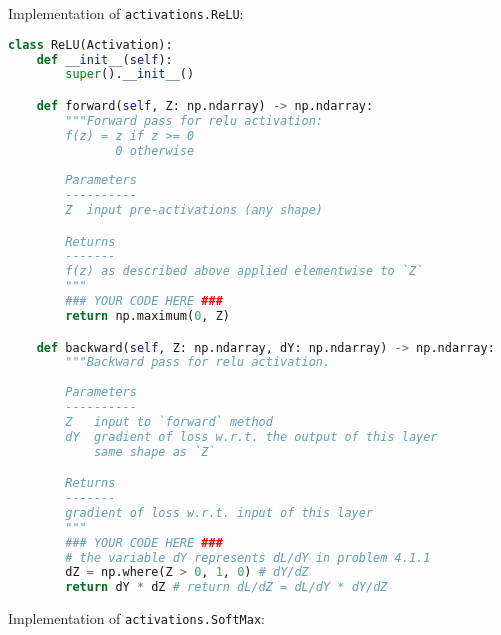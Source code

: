 Implementation of \texttt{activations.ReLU}:

\begin{lstlisting}[language=Python]
class ReLU(Activation):
    def __init__(self):
        super().__init__()

    def forward(self, Z: np.ndarray) -> np.ndarray:
        """Forward pass for relu activation:
        f(z) = z if z >= 0
               0 otherwise
        
        Parameters
        ----------
        Z  input pre-activations (any shape)

        Returns
        -------
        f(z) as described above applied elementwise to `Z`
        """
        ### YOUR CODE HERE ###
        return np.maximum(0, Z)

    def backward(self, Z: np.ndarray, dY: np.ndarray) -> np.ndarray:
        """Backward pass for relu activation.
        
        Parameters
        ----------
        Z   input to `forward` method
        dY  gradient of loss w.r.t. the output of this layer
            same shape as `Z`

        Returns
        -------
        gradient of loss w.r.t. input of this layer
        """
        ### YOUR CODE HERE ###
        # the variable dY represents dL/dY in problem 4.1.1
        dZ = np.where(Z > 0, 1, 0) # dY/dZ
        return dY * dZ # return dL/dZ = dL/dY * dY/dZ

\end{lstlisting}

Implementation of \texttt{activations.SoftMax}:

